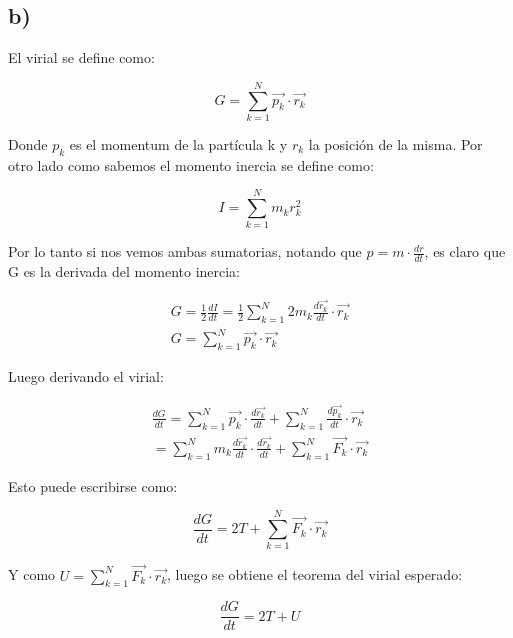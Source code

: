 \documentclass[2pt]{article}
\begin{document}
\subsection*{b)}

El virial se define como:

\begin{equation}
G=\sum^N_{k=1} \vec{p_k} \cdot \vec{r_k}
\end{equation}

Donde $p_k$ es el momentum de la partícula k y $r_k$ la posición de la misma.
Por otro lado como sabemos el momento inercia se define como:

\begin{equation}
I=\sum^N_{k=1} m_k r^2_k
\end{equation}

Por lo tanto si nos vemos ambas sumatorias, notando que $p=m\cdot \frac{dr}{dt}$, es claro que G es la derivada del momento inercia:

\begin{subequations}
\begin{align}
		G=\frac{1}{2} \frac{dI}{dt} =\frac{1}{2}\sum^N_{k=1} 2 m_k \frac{d \vec{r_k}}{dt} \cdot \vec{r_k} \\
		G=\sum^N_{k=1} \vec{p_k} \cdot \vec{r_k}
\end{align}
\end{subequations}

Luego derivando el virial:


\begin{subequations}
\begin{align}
		 \frac{dG}{dt} = \sum^N_{k=1} \vec{p_k} \cdot \frac{d\vec{r_k}}{dt} +  \sum^N_{k=1} \frac{d\vec{p_k}}{dt} \cdot \vec{r_k} \\
		 = \sum^N_{k=1} m_k \frac{d\vec{r_k}}{dt} \cdot \frac{d\vec{r_k}}{dt} + \sum^N_{k=1} \vec{F_k}\cdot \vec{r_k}
\end{align}
\end{subequations}

Esto puede escribirse como:

\begin{equation}
\frac{dG}{dt}= 2T + \sum^N_{k=1} \vec{F_k}\cdot \vec{r_k}
\end{equation}

Y como $U=\sum^N_{k=1} \vec{F_k}\cdot \vec{r_k}$, luego se obtiene el teorema del virial esperado:

\begin{equation}
\frac{dG}{dt}=2T + U
\end{equation}
\end{document}
